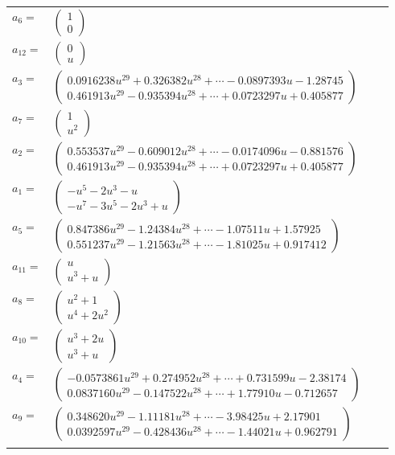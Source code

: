 \documentclass[1p]{elsarticle_modified}
\theoremstyle{definition}
\begin{document}
\begin{tabular}{m{7pt} m{180pt} m{7pt} m{180pt} }
\flushright $a_{6}=$&$\begin{pmatrix}1\\0\end{pmatrix}$ \\
\flushright $a_{12}=$&$\begin{pmatrix}0\\u\end{pmatrix}$ \\
\flushright $a_{3}=$&$\begin{pmatrix}0.0916238 u^{29}+0.326382 u^{28}+\cdots-0.0897393 u-1.28745\\0.461913 u^{29}-0.935394 u^{28}+\cdots+0.0723297 u+0.405877\end{pmatrix}$ \\
\flushright $a_{7}=$&$\begin{pmatrix}1\\u^2\end{pmatrix}$ \\
\flushright $a_{2}=$&$\begin{pmatrix}0.553537 u^{29}-0.609012 u^{28}+\cdots-0.0174096 u-0.881576\\0.461913 u^{29}-0.935394 u^{28}+\cdots+0.0723297 u+0.405877\end{pmatrix}$ \\
\flushright $a_{1}=$&$\begin{pmatrix}- u^5-2 u^3- u\\- u^7-3 u^5-2 u^3+u\end{pmatrix}$ \\
\flushright $a_{5}=$&$\begin{pmatrix}0.847386 u^{29}-1.24384 u^{28}+\cdots-1.07511 u+1.57925\\0.551237 u^{29}-1.21563 u^{28}+\cdots-1.81025 u+0.917412\end{pmatrix}$ \\
\flushright $a_{11}=$&$\begin{pmatrix}u\\u^3+u\end{pmatrix}$ \\
\flushright $a_{8}=$&$\begin{pmatrix}u^2+1\\u^4+2 u^2\end{pmatrix}$ \\
\flushright $a_{10}=$&$\begin{pmatrix}u^3+2 u\\u^3+u\end{pmatrix}$ \\
\flushright $a_{4}=$&$\begin{pmatrix}-0.0573861 u^{29}+0.274952 u^{28}+\cdots+0.731599 u-2.38174\\0.0837160 u^{29}-0.147522 u^{28}+\cdots+1.77910 u-0.712657\end{pmatrix}$ \\
\flushright $a_{9}=$&$\begin{pmatrix}0.348620 u^{29}-1.11181 u^{28}+\cdots-3.98425 u+2.17901\\0.0392597 u^{29}-0.428436 u^{28}+\cdots-1.44021 u+0.962791\end{pmatrix}$\\&\end{tabular}
\end{document}
